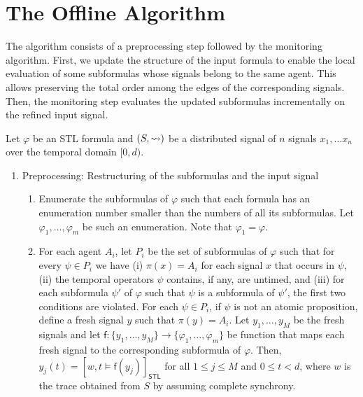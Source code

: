 \section{The Offline Algorithm}
The algorithm consists of a preprocessing step followed by the monitoring algorithm.
First, we update the structure of the input formula to enable the local evaluation of some subformulas whose signals belong to the same agent.
This allows preserving the total order among the edges of the corresponding signals.
Then, the monitoring step evaluates the updated subformulas incrementally on the refined input signal.

Let $\varphi$ be an STL formula and $(S,{\rightsquigarrow})$ be a distributed signal of $n$ signals $x_1, \ldots x_n$ over the temporal domain $[0,d)$.

\begin{enumerate}
	\item Preprocessing: Restructuring of the subformulas and the input signal
	\begin{enumerate}[label=\arabic*.]
		\item
		Enumerate the subformulas of $\varphi$ such that each formula has an enumeration number smaller than the numbers of all its subformulas.
		Let $\varphi_1, \ldots, \varphi_m$ be such an enumeration.
		Note that $\varphi_1 = \varphi$.
		
		\item
		For each agent $A_i$, let $P_i$ be the set of subformulas of $\varphi$ such that for every $\psi \in P_i$ we have
		(i) $\pi(x) = A_i$ for each signal $x$ that occurs in $\psi$,
		(ii) the temporal operators $\psi$ contains, if any, are untimed, and
		(iii) for each subformula $\psi'$ of $\varphi$ such that $\psi$ is a subformula of $\psi'$, the first two conditions are violated.
		For each $\psi \in P_i$, if $\psi$ is not an atomic proposition, define a fresh signal $y$ such that $\pi(y) = A_i$.
		Let $y_1, \ldots, y_M$ be the fresh signals and let $\mathsf{f} : \{y_1, \ldots, y_M\} \to \{\varphi_1, \ldots, \varphi_m\}$ be function that maps each fresh signal to the corresponding subformula of $\varphi$.
		Then, $y_j(t) = [w,t \models \mathsf{f}(y_j)]_{\mathsf{STL}}$ for all $1 \leq j \leq M$ and $0 \leq t < d$, where $w$ is the trace obtained from $S$ by assuming complete synchrony.
		
		

\end{enumerate}
\end{enumerate}
